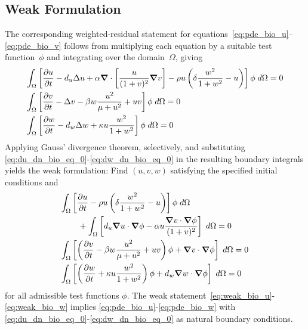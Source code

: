 \subsection{Weak Formulation}
The corresponding weighted-residual statement for equations~\eqref{eq:pde_bio_u}--\eqref{eq:pde_bio_v} follows from  multiplying each equation by a suitable test function~$\phi$ and integrating over the domain~$\Omega$, giving
\begin{align}
  \label{eq:weak_bio_u_preparts}
  \int_\Omega &\left[{\frac{\partial{u}}{\partial{t}}} - d_u \Delta u + \alpha {\boldsymbol{\nabla}} {}\cdot \left[ \frac{u}{(1+ v)^2} {\boldsymbol{\nabla}} {v} \right]
                                    - \rho u \left( \delta \frac{w^2}{1 + w^2} - u \right)\right]\phi\; d\Omega  = 0 \\
  \label{eq:weak_bio_v_preparts}
  \int_\Omega &\left[{\frac{\partial{v}}{\partial{t}}} - \Delta v - \beta w \frac{u^2}{\mu + u^2} + uv\right]\phi\; d\Omega = 0 \\
  \label{eq:weak_bio_w_preparts}
  \int_\Omega &\left[{\frac{\partial{w}}{\partial{t}}} - d_w \Delta w + \kappa u \frac{w^2}{1 + w^2}\right]\phi\; d\Omega = 0
\end{align}
Applying Gauss' divergence theorem, selectively, and substituting \eqref{eq:du_dn_bio_eq_0}-\eqref{eq:dw_dn_bio_eq_0} in the resulting boundary integrals  yields the weak formulation: Find $\left(u,v,w\right)$ satisfying the specified initial conditions and
\begin{align}
  \int_\Omega& \left[{\frac{\partial{u}}{\partial{t}}} - \rho u \left( \delta \frac{w^2}{1 + w^2} - u \right) \right]\phi\; d\Omega \nonumber \\
  \label{eq:weak_bio_u}
  &\;\;\;+ \int_\Omega \left[d_u {\boldsymbol{\nabla}} {u}\cdot{\boldsymbol{\nabla}} {\phi} - \alpha u \frac{{\boldsymbol{\nabla}} {v}\cdot{\boldsymbol{\nabla}} {\phi}}{(1+ v)^2} \right]\; d\Omega  = 0 \\  
  \label{eq:weak_bio_v}
  \int_\Omega& \left[\left({\frac{\partial{v}}{\partial{t}}} - \beta w \frac{u^2}{\mu + u^2} + uv\right)\phi + {\boldsymbol{\nabla}} {v}\cdot{\boldsymbol{\nabla}} {\phi}\right]\; d\Omega = 0 \\  
  \label{eq:weak_bio_w}
  \int_\Omega& \left[\left({\frac{\partial{w}}{\partial{t}}} + \kappa u \frac{w^2}{1 + w^2}\right)\phi + d_w{\boldsymbol{\nabla}} {w}\cdot{\boldsymbol{\nabla}} {\phi}\right]\; d\Omega = 0
\end{align}
for all admissible test functions $\phi$.  The weak statement~\eqref{eq:weak_bio_u}-\eqref{eq:weak_bio_w} implies \eqref{eq:pde_bio_u}-\eqref{eq:pde_bio_w} with \eqref{eq:du_dn_bio_eq_0}-\eqref{eq:dw_dn_bio_eq_0} as natural boundary conditions.




